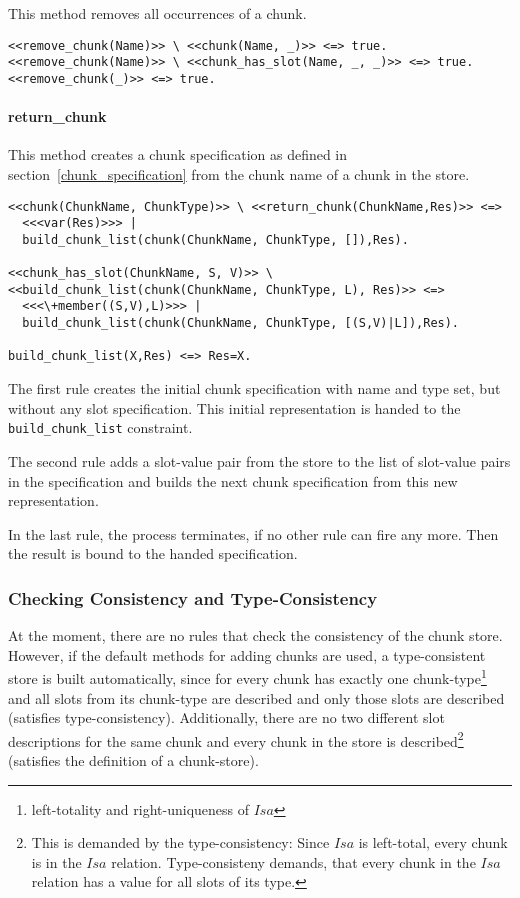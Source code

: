 This method removes all occurrences of a chunk.

\begin{lstlisting}
<<remove_chunk(Name)>> \ <<chunk(Name, _)>> <=> true.
<<remove_chunk(Name)>> \ <<chunk_has_slot(Name, _, _)>> <=> true.
<<remove_chunk(_)>> <=> true.
\end{lstlisting}

\paragraph{return\_chunk}

This method creates a chunk specification as defined in section~\ref{chunk_specification} from the chunk name of a chunk in the store.

\begin{lstlisting}[caption={rules for \texttt{return\_chunk}}]
<<chunk(ChunkName, ChunkType)>> \ <<return_chunk(ChunkName,Res)>> <=> 
  <<<var(Res)>>> | 
  build_chunk_list(chunk(ChunkName, ChunkType, []),Res).

<<chunk_has_slot(ChunkName, S, V)>> \ <<build_chunk_list(chunk(ChunkName, ChunkType, L), Res)>> <=> 
  <<<\+member((S,V),L)>>> | 
  build_chunk_list(chunk(ChunkName, ChunkType, [(S,V)|L]),Res).
  
build_chunk_list(X,Res) <=> Res=X.
\end{lstlisting}

The first rule creates the initial chunk specification with name and type set, but without any slot specification. This initial representation is handed to the \verb|build_chunk_list| constraint.

The second rule adds a slot-value pair from the store to the list of slot-value pairs in the specification and builds the next chunk specification from this new representation.

In the last rule, the process terminates, if no other rule can fire any more. Then the result is bound to the handed specification.

\subsubsection{Checking Consistency and Type-Consistency}

At the moment, there are no rules that check the consistency of the chunk store. However, if the default methods for adding chunks are used, a type-consistent store is built automatically, since for every chunk has exactly one chunk-type\footnote{left-totality and right-uniqueness of $Isa$} and all slots from its chunk-type are described and only those slots are described (satisfies type-consistency). Additionally, there are no two different slot descriptions for the same chunk and every chunk in the store is described\footnote{This is demanded by the type-consistency: Since $Isa$ is left-total, every chunk is in the $Isa$ relation. Type-consisteny demands, that every chunk in the $Isa$ relation has a value for all slots of its type.} (satisfies the definition of a chunk-store).

